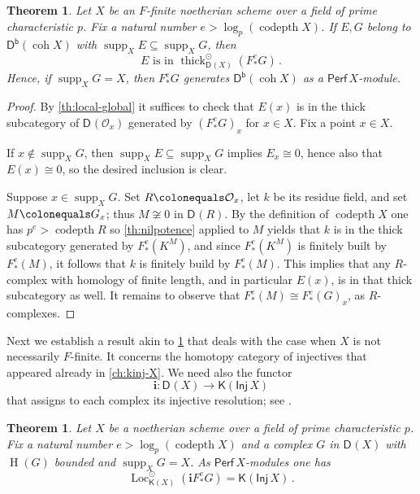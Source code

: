 \documentclass{amsart}
\newcommand{\dcat}[2][]{\cat{D}_{#1}(#2)}
\newcommand{\kinj}[1]{\cat{K}(\cat{Inj}\,#1)}
\newcommand{\perf}[1]{\mathsf{Perf}\,#1}
\newcommand{\coh}{\operatorname{coh}}
\newcommand{\dbcat}[1]{\cat{D}^{\mathsf{b}}(#1)}
\newcommand{\mco}{\mathcal{O}}
\newcommand{\bfi}{\boldsymbol{i}}
\newcommand{\cat}[1]{{\mathsf{#1}}}
\newcommand{\codepth}{\operatorname{codepth}}
\newcommand{\hh}{\operatorname{H}}
\newcommand{\Loc}{\operatorname{Loc}}
\newcommand{\res}[2]{{#1}(#2)}
\newcommand{\supp}{\operatorname{supp}}
\newcommand{\thick}{\operatorname{thick}}
\newtheorem{theorem}[subsection]{Theorem}
\theoremstyle{definition}
\theoremstyle{remark}
\numberwithin{equation}{subsection}
\begin{document}
\begin{theorem}
\label{th:strong-generation}
Let $X$ be an $F$-finite noetherian scheme over a field of prime characteristic $p$. Fix a natural number $e> \log_p(\codepth X)$. If $E,G$ belong to $\dbcat{\coh X}$ with $\supp_XE\subseteq \supp_XG$, then 
\[
E\text{ is in }\thick^{\odot}_{\dcat X}(F_*^e{G})\,.
\]
Hence, if $\supp_X G=X$, then $F_*^eG$ generates $\dbcat{\coh X}$ as a $\perf X$-module.
\end{theorem}


\begin{proof}
By \cref{th:local-global} it suffices to check that $\res{E}x$ is in the thick subcategory of $\dcat{\mco_{x}}$ generated by $(F _*^eG)_x$ for $x\in X$. Fix a point $x\in X$.

If $x\notin \supp_XG$, then $\supp_XE\subseteq \supp_XG$ implies $E_x\cong 0$, hence also that $\res{E}x\cong 0$, so the desired inclusion is clear.

Suppose $x\in \supp_XG$. Set $R\colonequals \mco_{x}$, let $k$ be its residue field, and set $M\colonequals G_x$; thus $M\not\cong 0$ in $\dcat R$. By the definition of $\codepth X$ one has $p^e> \codepth R$ so \cref{th:nilpotence} applied to $M$ yields that $k$ is in the thick subcategory generated by $F ^e_*(K^M)$, and since $F ^e_*(K^M)$ is finitely built by $F^e_*(M)$, it  follows that $k$ is finitely build by $F^e_*(M)$. This implies that any $R$-complex with homology of finite length, and in particular $\res{E}x$, is in that thick subcategory as well. It remains to observe that $F ^e_*(M)\cong F ^e_*(G)_x$, as $R$-complexes. 
\end{proof}

Next we establish a result akin to \cref{th:strong-generation} that deals with the case when $X$ is not necessarily $F $-finite. It concerns the homotopy category of injectives that appeared already in \cref{ch:kinj-X}. We need also the functor
\[
\bfi \colon \dcat X \longrightarrow \kinj X
\]
that assigns to each complex its injective resolution; see \cite[Section 4.3]{Krause:2022}. 

\begin{theorem}
\label{th:kinj-generation}
Let $X$ be a noetherian scheme over a field of prime characteristic $p$. Fix a natural number $e> \log_p(\codepth X)$ and a complex $G$ in $\dcat{X}$ with $\hh(G)$ bounded and $\supp_XG=X$. As $\perf X$-modules one has
 \[
\Loc^{\odot}_{\cat K(X)}(\bfi F ^e_*G)=\kinj X\,.
 \]
\end{theorem}
\end{document}
